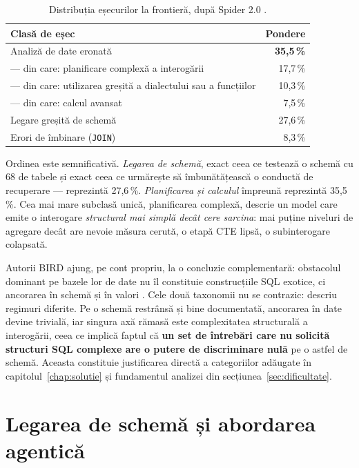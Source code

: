\documentclass[12pt,a4paper]{report}
\newcommand{\hd}[1]{\textbf{#1}}
\newcommand{\code}[1]{\texttt{\small #1}}
\begin{document}
\begin{table}[H]
\centering
\caption{Distribuția eșecurilor la frontieră, după Spider 2.0 \cite{spider2}.}
\label{tab:taxonomie}
\footnotesize
\begin{tabularx}{\textwidth}{@{}L r@{}}
\toprule
\hd{Clasă de eșec} & \hd{Pondere} \\
\midrule
Analiză de date eronată & \textbf{35,5\,\%} \\
\quad --- din care: planificare complexă a interogării & 17,7\,\% \\
\quad --- din care: utilizarea greșită a dialectului sau a funcțiilor & 10,3\,\% \\
\quad --- din care: calcul avansat & 7,5\,\% \\
Legare greșită de schemă & 27,6\,\% \\
Erori de îmbinare (\code{JOIN}) & 8,3\,\% \\
\bottomrule
\end{tabularx}
\end{table}

Ordinea este semnificativă. \emph{Legarea de schemă}, exact ceea ce
testează o schemă cu 68 de tabele și exact ceea ce urmărește să îmbunătățească
o conductă de recuperare — reprezintă 27,6\,\%. \emph{Planificarea și
calculul} împreună reprezintă 35,5\,\%. Cea mai mare subclasă unică,
planificarea complexă, descrie un model care emite o interogare
\emph{structural mai simplă decât cere sarcina}: mai puține niveluri de
agregare decât are nevoie măsura cerută, o etapă CTE lipsă, o subinterogare
colapsată.

Autorii BIRD ajung, pe cont propriu, la o concluzie complementară: obstacolul
dominant pe bazele lor de date nu îl constituie construcțiile SQL exotice, ci
ancorarea în schemă și în valori \cite{bird}. Cele două
taxonomii nu se contrazic: descriu regimuri diferite. Pe o schemă restrânsă și bine
documentată, ancorarea în date devine trivială, iar singura axă rămasă este complexitatea
structurală a interogării, ceea ce implică faptul că \textbf{un set de întrebări care nu
solicită structuri SQL complexe are o putere de discriminare nulă} pe o astfel de schemă. Aceasta
constituie justificarea directă a categoriilor adăugate în capitolul~\ref{chap:solutie} și fundamentul
analizei din secțiunea~\ref{sec:dificultate}.

\section{Legarea de schemă și abordarea agentică}
\end{document}
